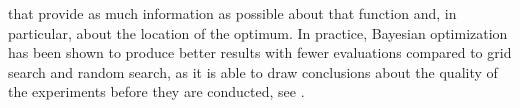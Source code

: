 that provide as much information as possible about that function and, in particular, about the location of the optimum. In practice, Bayesian optimization has been shown to produce better results with fewer evaluations compared to grid search and random search, as it is able to draw conclusions about the quality of the experiments before they are conducted, see \cite{SnoekLarochelleAdams:2012}.








